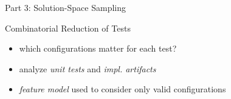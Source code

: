 \begin{frame}{\myframetitle}
\begin{mycolumns}
\begin{example}{Part 3: Solution-Space Sampling}
\begin{itemize}
			\end{itemize}
		\end{example}
		\pause
		\begin{example}{Combinatorial Reduction of Tests \mysource{\reducingconfigurations}}
			\begin{itemize}
				\item which configurations matter for each test?
				\item analyze \emph{unit tests} and \emph{impl. artifacts}
				\item \emph{feature model} used to consider only valid configurations
			\end{itemize}
		\end{example}
	\end{mycolumns}
\end{frame}
